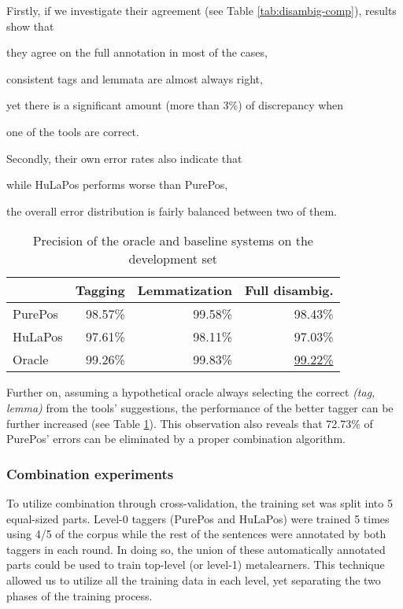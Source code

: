 Firstly, if we investigate their agreement (see Table \ref{tab:disambig-comp}), results show that 
\begin{inparaenum}[1)]
 \item they agree on the full annotation in most of the cases,
 \item consistent tags and lemmata are almost always right,
 \item yet there is a significant amount (more than 3\%) of discrepancy when
 \item one of the tools are correct.
\end{inparaenum}
Secondly, their own error rates also indicate that
\begin{inparaenum}[1)]
 \item while HuLaPos performs worse than PurePos,
 \item the overall error distribution is fairly balanced between two of them.
\end{inparaenum}


\begin{table}[h]
\centering
\caption{Precision of the oracle and baseline systems on the development set}\label{tab:disambig-acc}
\begin{tabular}{l r r r}
\hline
& Tagging & Lemmatization & Full disambig. \\
\hline
PurePos & 98.57\% & 99.58\% & 98.43\% \\
HuLaPos & 97.61\% & 98.11\% & 97.03\% \\
Oracle & 99.26\% & 99.83\% & \underline{99.22\%} \\
\hline
\end{tabular}
\end{table}

Further on, assuming a hypothetical oracle always selecting the correct \emph{(tag, lemma)} from the tools' suggestions, the performance of the better tagger can be further increased (see Table \ref{tab:disambig-acc}). This observation also reveals that 72.73\% of PurePos' errors can be eliminated by a proper combination algorithm. 

\subsubsection{Combination experiments}


To utilize combination through cross-validation, the training set was split into 5 equal-sized parts. 
Level-0 taggers (PurePos and HuLaPos) were trained 5 times using 4/5 of the corpus while the rest of the sentences were annotated by both taggers in each round. 
In doing so, the union of these automatically annotated parts could be used to train top-level (or level-1) metalearners. This technique allowed us to utilize all the training data in each level, yet separating the two phases of the training process. 

